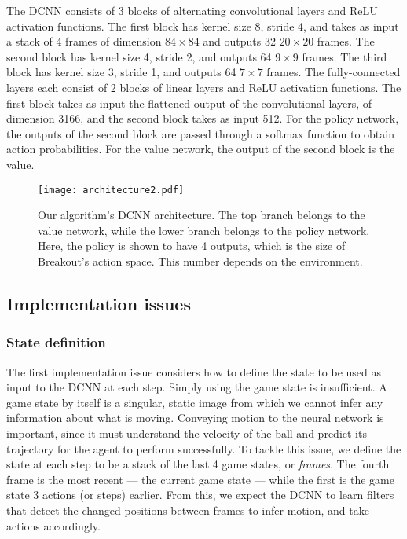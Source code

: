 \documentclass[12pt,a4paper]{article}
\begin{document}
The DCNN consists of 3 blocks of alternating convolutional layers and ReLU activation functions. The first block has kernel size 8, stride 4, and takes as input a stack of 4 frames of dimension $84 \times 84$ and outputs 32 $20 \times 20$ frames. The second block has kernel size 4, stride 2, and outputs 64 $9 \times 9$ frames. The third block has kernel size 3, stride 1, and outputs 64 $7 \times 7$ frames. The fully-connected layers each consist of 2 blocks of linear layers and ReLU activation functions. The first block takes as input the flattened output of the convolutional layers, of dimension 3166, and the second block takes as input 512. For the policy network, the outputs of the second block are passed through a softmax function to obtain action probabilities. For the value network, the output of the second block is the value.

\begin{figure}[ht]
    \centering
    \texttt{[image: architecture2.pdf]}
    \caption{Our algorithm's DCNN architecture. The top branch belongs to the value network, while the lower branch belongs to the policy network. Here, the policy is shown to have 4 outputs, which is the size of Breakout's action space. This number depends on the environment.}
  \end{figure}

\subsection{Implementation issues}
\subsubsection{State definition}
The first implementation issue considers how to define the state to be used as input to the DCNN at each step. Simply using the game state is insufficient. A game state by itself is a singular, static image from which we cannot infer any information about what is moving. Conveying motion to the neural network is important, since it must understand the velocity of the ball and predict its trajectory for the agent to perform successfully. To tackle this issue, we define the state at each step to be a stack of the last 4 game states, or \emph{frames}. The fourth frame is the most recent --- the current game state --- while the first is the game state 3 actions (or steps) earlier. From this, we expect the DCNN to learn filters that detect the changed positions between frames to infer motion, and take actions accordingly.
\end{document}
